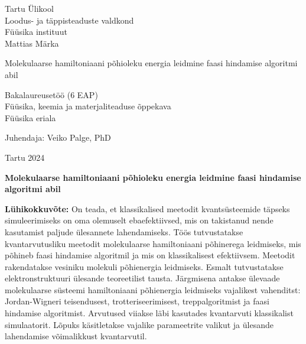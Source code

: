 \documentclass[12pt]{report}
\begin{document}
\begin{titlepage}
    \begin{center}
        \large
        {\sc Tartu Ülikool} \\
        Loodus- ja täppisteaduste valdkond \\
        Füüsika instituut \\


        \vspace{25mm}
        \Large Mattias Märka

        \vspace{4mm}
        \Huge Molekulaarse hamiltoniaani põhioleku energia leidmine faasi hindamise algoritmi abil

        \vspace{20mm}
        \Large Bakalaureusetöö (6 EAP) \\
        Füüsika, keemia ja materjaliteaduse õppekava \\
	Füüsika eriala \\

        \vspace{20mm}
        \begin{flushright}
            \Large Juhendaja: Veiko Palge, PhD
        \end{flushright}

        \vfill
        \large Tartu 2024
    \end{center}
\end{titlepage}

\newpage

\noindent\textbf{\large Molekulaarse hamiltoniaani põhioleku energia leidmine faasi hindamise algoritmi abil}

\vspace*{1ex}

\noindent\textbf{Lühikokkuvõte:}
On teada, et klassikalised meetodit kvantsüsteemide täpseks simuleerimiseks on oma olemuselt ebaefektiivsed, mis on takistanud nende kasutamist paljude ülesannete lahendamiseks.
Töös tutvustatakse kvantarvutusliku meetodit molekulaarse hamiltoniaani põhinerega leidmiseks, mis põhineb faasi hindamise algoritmil ja mis on klassikalisest efektiivsem.
Meetodit rakendatakse vesiniku molekuli põhienergia leidmiseks.
Esmalt tutvustatakse elektronstruktuuri ülesande teoreetilist tausta.
Järgmisena antakse ülevaade molekulaarse süsteemi hamiltoniaani põhienergia leidmiseks vajalikest vahenditst: Jordan-Wigneri teisendusest, trotteriseerimisest, treppalgoritmist ja faasi hindamise algoritmist.
Arvutused viiakse läbi kasutades kvantarvuti klassikalist simulaatorit.
Lõpuks käsitletakse vajalike parameetrite valikut ja ülesande lahendamise võimalikkust kvantarvutil.
\end{document}
